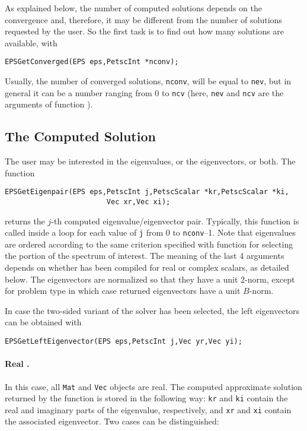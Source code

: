 As explained below, the number of computed solutions depends on the convergence and, therefore, it may be different from the number of solutions requested by the user. So the first task is to find out how many solutions are available, with
        \begin{Verbatim}[fontsize=\small]
        EPSGetConverged(EPS eps,PetscInt *nconv);
        \end{Verbatim}
Usually, the number of converged solutions, \texttt{nconv}, will be equal to \texttt{nev}, but in general it can be a number ranging from 0 to \texttt{ncv} (here, \texttt{nev} and \texttt{ncv} are the arguments of function ).

\subsection{The Computed Solution}

The user may be interested in the eigenvalues, or the eigenvectors, or both. The function
        \begin{Verbatim}[fontsize=\small]
        EPSGetEigenpair(EPS eps,PetscInt j,PetscScalar *kr,PetscScalar *ki,
                        Vec xr,Vec xi);
        \end{Verbatim}
returns the $j$-th computed eigenvalue/eigenvector pair. Typically, this function is called inside a loop for each value of \texttt{j} from 0 to \texttt{nconv}--1. Note that eigenvalues are ordered according to the same criterion specified with function  for selecting the portion of the spectrum of interest.
The meaning of the last 4 arguments depends on whether \slepc has been compiled for real or complex scalars, as detailed below. The eigenvectors are normalized so that they have a unit 2-norm, except for problem type  in which case returned eigenvectors have a unit $B$-norm.

In case the two-sided variant of the solver has been selected, the left eigenvectors can be obtained with
        \begin{Verbatim}[fontsize=\small]
        EPSGetLeftEigenvector(EPS eps,PetscInt j,Vec yr,Vec yi);
        \end{Verbatim}

\paragraph{Real \slepc.} In this case, all \texttt{Mat} and \texttt{Vec} objects are real. The computed approximate solution returned by the function  is stored in the following way: \texttt{kr} and \texttt{ki} contain the real and imaginary parts of the eigenvalue, respectively, and \texttt{xr} and \texttt{xi} contain the associated eigenvector. Two cases can be distinguished:

